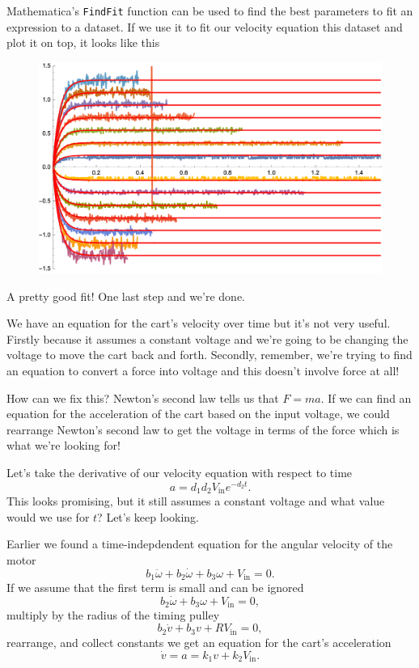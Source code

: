 \documentclass{article}
\begin{document}
Mathematica's \texttt{FindFit} function can be used to find the best parameters to fit an expression to a dataset. If we use it to fit our velocity equation this dataset and plot it on top, it looks like this

\begin{figure}[H]
  \centering
  \includegraphics[width=\textwidth]{angular_velocities_fitted}
\end{figure}

A pretty good fit! One last step and we're done.

We have an equation for the cart's velocity over time but it's not very useful. Firstly because it assumes a constant voltage and we're going to be changing the voltage to move the cart back and forth. Secondly, remember, we're trying to find an equation to convert a force into voltage and this doesn't involve force at all!

How can we fix this? Newton's second law tells us that $F = m a$. If we can find an equation for the acceleration of the cart based on the input voltage, we could rearrange Newton's second law to get the voltage in terms of the force which is what we're looking for!

Let's take the derivative of our velocity equation with respect to time \[a = d_1 d_2 V_\text{in} e^{-d_2 t}.\] This looks promising, but it still assumes a constant voltage and what value would we use for $t$? Let's keep looking.

Earlier we found a time-indepdendent equation for the angular velocity of the motor \[b_1 \ddot{\omega} + b_2 \dot{\omega} + b_3 \omega + V_\text{in} = 0.\] If we assume that the first term is small and can be ignored \[b_2 \dot{\omega} + b_3 \omega + V_\text{in} = 0,\] multiply by the radius of the timing pulley \[b_2 \dot{v} + b_3 v + R V_\text{in} = 0,\] rearrange, and collect constants we get an equation for the cart's acceleration \[\dot{v} = a = k_1 v + k_2 V_\text{in}.\]
\end{document}
